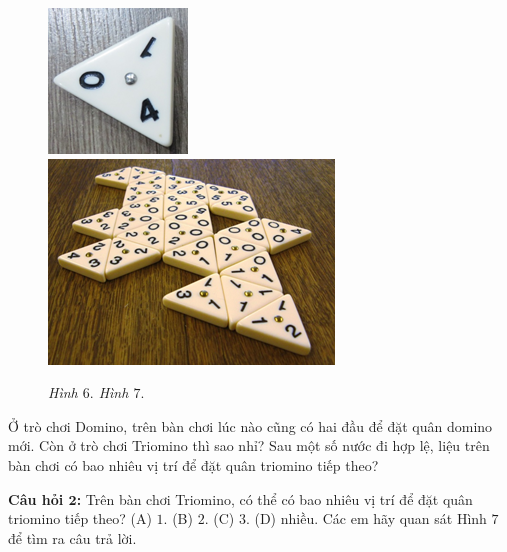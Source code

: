 	\begin{multicols}{2}
		\begin{figure}[H]
			\centering
			\vspace*{5pt}
			\captionsetup{labelformat=empty, justification=centering}
			\includegraphics[height=0.19\textwidth]{h4a}
			\includegraphics[height=0.19\textwidth]{h5a}
			\caption{\textit{\small Hình $6.$ \hspace{50pt}Hình $7.$}}
			\vspace*{-5pt}
		\end{figure}
		\vspace*{-5pt}
		Ở trò chơi Domino, trên bàn chơi lúc nào cũng có hai đầu để đặt quân domino mới. Còn ở trò chơi Triomino thì sao nhỉ? Sau một số nước đi hợp lệ, liệu trên bàn chơi có bao nhiêu vị trí để đặt quân \linebreak triomino tiếp theo?
	\end{multicols}
	\textbf{Câu hỏi $\pmb{2}$:}
	\vskip 0.1cm
	Trên bàn chơi Triomino, có thể có bao nhiêu vị trí để đặt quân triomino tiếp theo?
	\vskip 0.2cm
	\hspace*{20pt}(A)  $1.$ \hspace*{50pt}(B)  $2.$
	\hspace*{50pt}(C)  $3.$ \hspace*{50pt}(D)  nhiều.
	\vskip 0.2cm
	Các em hãy quan sát Hình $7$ để tìm ra câu trả lời.
